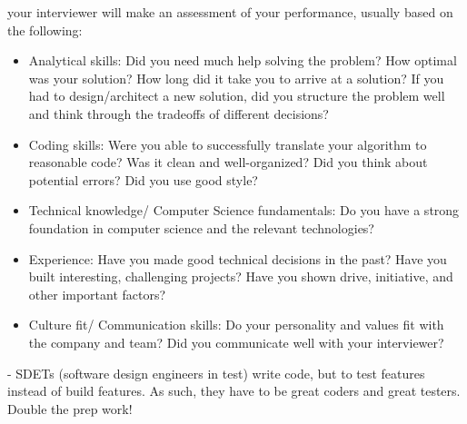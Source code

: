 \documentclass[14pt, noindent]{article}
\begin{document}
\vspace{10pt}
\Large{your interviewer will make an assessment of your performance, usually based on the following:}\\
\begin{itemize}
\item Analytical skills: Did you need much help solving the problem? How optimal was your solution? How
  long did it take you to arrive at a solution? If you had to design/architect a new solution,
  did you structure the problem well and think through the tradeoffs of different decisions?
\item Coding skills: Were you able to successfully translate your algorithm to reasonable code? Was
      it clean and well-organized? Did you think about potential errors? Did you use good style?
\item Technical knowledge/ Computer Science fundamentals: Do you have a strong foundation in computer
      science and the relevant technologies?
\item Experience: Have you made good technical decisions in the past? Have you built interesting,
      challenging projects? Have you shown drive, initiative, and other important factors?
\item Culture fit/ Communication skills: Do your personality and values fit with the company and team? Did
      you communicate well with your interviewer?
\end{itemize}

\vspace{20pt}
- SDETs (software design engineers in test) write code, but to test features instead of build features.
  As such, they have to be great coders and great testers. Double the prep work!
\end{document}
